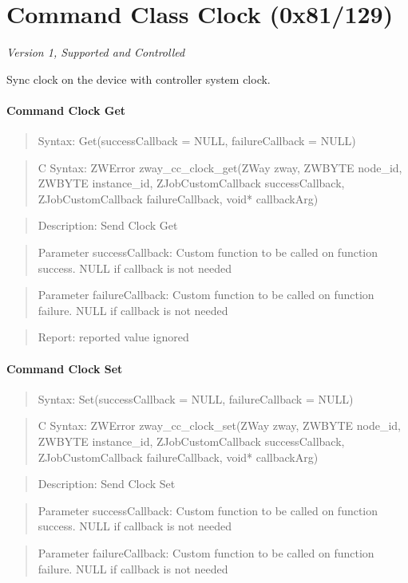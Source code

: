 \section{Command Class Clock (0x81/129)}

\textit{Version 1, Supported and Controlled}
\newline

Sync clock on the device with controller system clock.
\paragraph{Command Clock Get}
\begin{quote}Syntax: Get(successCallback = NULL, failureCallback = NULL)\end{quote}
\begin{quote}C Syntax: ZWError zway\_cc\_clock\_get(ZWay zway, ZWBYTE node\_id, ZWBYTE instance\_id, ZJobCustomCallback successCallback, ZJobCustomCallback failureCallback, void* callbackArg)\end{quote}
\begin{quote}Description: Send Clock Get\end{quote}
\begin{quote}Parameter successCallback: Custom function to be called on function success. NULL if callback is not needed\end{quote}
\begin{quote}Parameter failureCallback: Custom function to be called on function failure. NULL if callback is not needed\end{quote}
\begin{quote}Report: reported value ignored\end{quote}

\paragraph{Command Clock Set}
\begin{quote}Syntax: Set(successCallback = NULL, failureCallback = NULL)\end{quote}
\begin{quote}C Syntax: ZWError zway\_cc\_clock\_set(ZWay zway, ZWBYTE node\_id, ZWBYTE instance\_id, ZJobCustomCallback successCallback, ZJobCustomCallback failureCallback, void* callbackArg)\end{quote}
\begin{quote}Description: Send Clock Set\end{quote}
\begin{quote}Parameter successCallback: Custom function to be called on function success. NULL if callback is not needed\end{quote}
\begin{quote}Parameter failureCallback: Custom function to be called on function failure. NULL if callback is not needed\end{quote}



